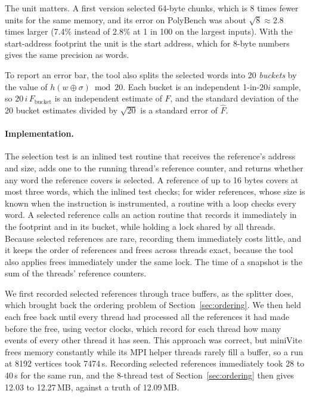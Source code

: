 \documentclass[11pt]{article}
\newcommand{\secref}[1]{Section~\ref{#1}}
\newcommand{\term}[1]{\emph{#1}}
\begin{document}
The unit matters. A first version selected 64-byte chunks, which is 8 times fewer units for the same memory, and its error on PolyBench was about $\sqrt{8} \approx 2.8$ times larger (7.4\% instead of 2.8\% at 1 in 100 on the largest inputs). With the start-address footprint the unit is the start address, which for 8-byte numbers gives the same precision as words.

To report an error bar, the tool also splits the selected words into 20 \term{buckets} by the value of $h(w \oplus \sigma) \bmod 20$. Each bucket is an independent 1-in-$20i$ sample, so $20\,i\,F_{\text{bucket}}$ is an independent estimate of $F$, and the standard deviation of the 20 bucket estimates divided by $\sqrt{20}$ is a standard error of $\hat{F}$.

\paragraph{Implementation.}
The selection test is an inlined test routine that receives the reference's address and size, adds one to the running thread's reference counter, and returns whether any word the reference covers is selected. A reference of up to 16 bytes covers at most three words, which the inlined test checks; for wider references, whose size is known when the instruction is instrumented, a routine with a loop checks every word. A selected reference calls an action routine that records it immediately in the footprint and in its bucket, while holding a lock shared by all threads. Because selected references are rare, recording them immediately costs little, and it keeps the order of references and frees across threads exact, because the tool also applies frees immediately under the same lock. The time of a snapshot is the sum of the threads' reference counters.

We first recorded selected references through trace buffers, as the splitter does, which brought back the ordering problem of \secref{sec:ordering}. We then held each free back until every thread had processed all the references it had made before the free, using vector clocks, which record for each thread how many events of every other thread it has seen. This approach was correct, but miniVite frees memory constantly while its MPI helper threads rarely fill a buffer, so a run at 8192 vertices took 7474\,s. Recording selected references immediately took 28 to 40\,s for the same run, and the 8-thread test of \secref{sec:ordering} then gives 12.03 to 12.27\,MB, against a truth of 12.09\,MB.
\end{document}

